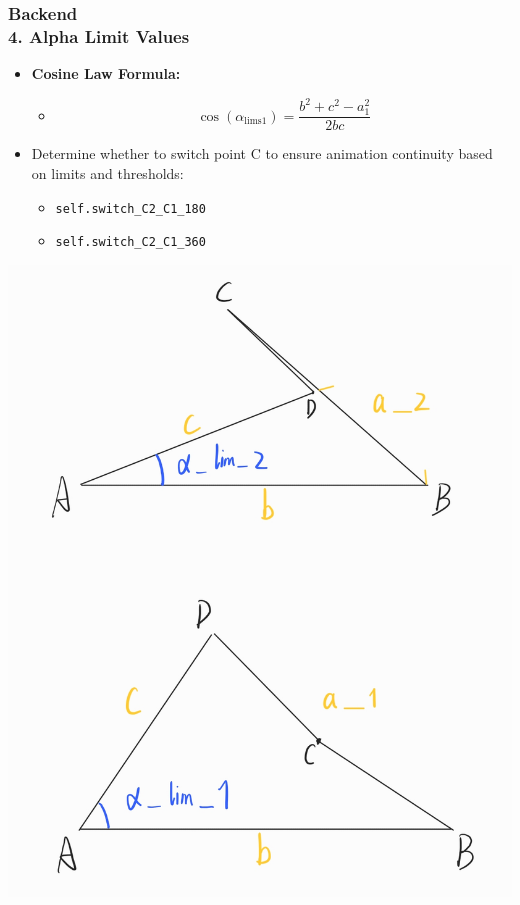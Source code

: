 \documentclass[ucs,10pt]{beamer}
\begin{document}
\begin{frame}
    \frametitle{Backend \\ \small \color{rwth-blue} 4. Alpha Limit Values}
    \begin{minipage}{0.5\linewidth}
        \begin{itemize}
            \item \textbf{Cosine Law Formula:}
            \begin{itemize}
                \item \[
                    \cos(\alpha_{\text{lims1}}) = \frac{b^2 + c^2 - a_1^2}{2bc}
                \]
            \end{itemize}
            \item Determine whether to switch point C to ensure animation continuity based on limits and thresholds:
            \begin{itemize}
                \item \texttt{self.switch\_C2\_C1\_180}
                \item \texttt{self.switch\_C2\_C1\_360}
            \end{itemize}
        \end{itemize}
    \end{minipage}
    \hspace{0.02\linewidth} %
    \begin{minipage}{0.45\linewidth}
        \begin{center}
            \includegraphics[width=\linewidth]{./Figures/alpha_lim.png}
        \end{center}
    \end{minipage}
\end{frame}
\end{document}
